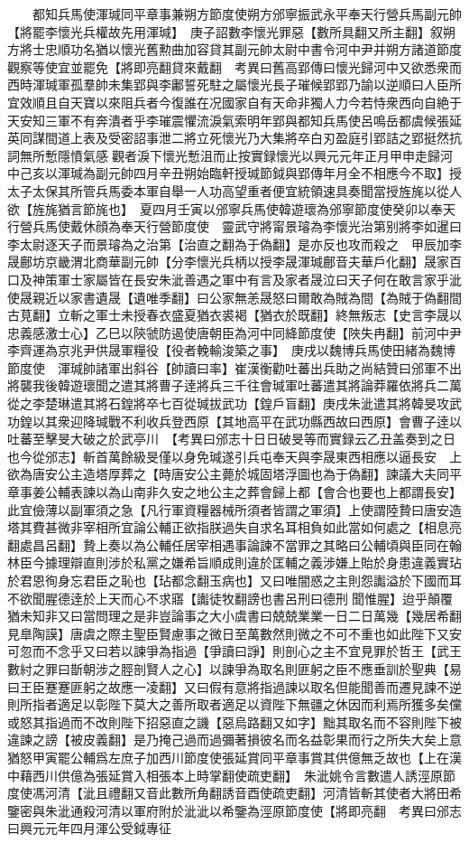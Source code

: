 　　都知兵馬使渾瑊同平章事兼朔方節度使朔方邠寧振武永平奉天行營兵馬副元帥【將罷李懷光兵權故先用渾瑊】　庚子詔數李懷光罪惡【數所具翻又所主翻】叙朔方將士忠順功名猶以懷光舊勲曲加容貸其副元帥太尉中書令河中尹并朔方諸道節度觀察等使宜並罷免【將即亮翻貸來戴翻　考異曰舊高郢傳曰懷光歸河中又欲悉衆而西時渾瑊軍孤羣帥未集郢與李鄘誓死駐之屬懷光長子璀候郢郢乃諭以逆順曰人臣所宜效順且自天寶以來阻兵者今復誰在况國家自有天命非獨人力今若恃衆西向自絶于天安知三軍不有奔潰者乎李璀震懼流淚氣索明年郢與都知兵馬使呂鳴岳都虞候張延英同謀間道上表及受密詔事泄二將立死懷光乃大集將卒白刃盈庭引郢詰之郢挺然抗詞無所慙隱憤氣感觀者淚下懷光慙沮而止按實録懷光以興元元年正月甲申走歸河中己亥以渾瑊為副元帥四月辛丑朔始臨軒授瑊節鉞與郢傳年月全不相應今不取】授太子太保其所管兵馬委本軍自舉一人功高望重者便宜統領速具奏聞當授旌旄以從人欲【旌旄猶言節旄也】　夏四月壬寅以邠寧兵馬使韓遊瓌為邠寧節度使癸卯以奉天行營兵馬使戴休顔為奉天行營節度使　靈武守將甯景璿為李懷光治第别將李如暹曰李太尉逐天子而景璿為之治第【治直之翻為于偽翻】是亦反也攻而殺之　甲辰加李晟鄜坊京畿渭北商華副元帥【分李懷光兵柄以授李晟渾瑊鄜音夫華戶化翻】晟家百口及神策軍士家屬皆在長安朱泚善遇之軍中有言及家者晟泣曰天子何在敢言家乎泚使晟親近以家書遺晟【遺唯季翻】曰公家無恙晟怒曰爾敢為賊為間【為賊于偽翻間古莧翻】立斬之軍士未授春衣盛夏猶衣裘褐【猶衣於既翻】終無叛志【史言李晟以忠義感激士心】乙巳以陝虢防遏使唐朝臣為河中同絳節度使【陜失冉翻】前河中尹李齊運為京兆尹供晟軍糧役【役者輓輸浚築之事】　庚戌以魏博兵馬使田緒為魏博節度使　渾瑊帥諸軍出斜谷【帥讀曰率】崔漢衡勸吐蕃出兵助之尚結贊曰邠軍不出將襲我後韓遊瓌聞之遣其將曹子逹將兵三千往會瑊軍吐蕃遣其將論莽羅依將兵二萬從之李楚琳遣其將石鍠將卒七百從瑊拔武功【鍠戶盲翻】庚戌朱泚遣其將韓旻攻武功鍠以其衆迎降瑊戰不利收兵登西原【其地高平在武功縣西故曰西原】會曹子逹以吐蕃至擊旻大破之於武亭川　【考異曰邠志十日日破旻等而實録云乙丑盖奏到之日也今從邠志】斬首萬餘級旻僅以身免瑊遂引兵屯奉天與李晟東西相應以逼長安　上欲為唐安公主造塔厚葬之【時唐安公主薨於城固塔浮圖也為于偽翻】諫議大夫同平章事姜公輔表諫以為山南非久安之地公主之葬會歸上都【會合也要也上都謂長安】此宜儉薄以副軍須之急【凡行軍資糧器械所須者皆謂之軍須】上使謂陸贄曰唐安造塔其費甚微非宰相所宜論公輔正欲指朕過失自求名耳相負如此當如何處之【相息亮翻處昌呂翻】贄上奏以為公輔任居宰相遇事論諫不當罪之其略曰公輔頃與臣同在翰林臣今據理辯直則涉於私黨之嫌希旨順成則違於匡輔之義涉嫌上貽於身患違義實玷於君恩徇身忘君臣之恥也【玷都念翻玉病也】又曰唯闇惑之主則怨讟溢於下國而耳不欲聞腥德逹於上天而心不求寤【讟徒牧翻謗也書呂刑曰德刑聞惟腥】迨乎顛覆猶未知非又曰當問理之是非豈論事之大小虞書曰兢兢業業一日二日萬幾【幾居希翻見臯陶謨】唐虞之際主聖臣賢慮事之微日至萬數然則微之不可不重也如此陛下又安可忽而不念乎又曰若以諫爭為指過【爭讀曰諍】則剖心之主不宜見罪於哲王【武王數紂之罪曰斮朝涉之脛剖賢人之心】以諫爭為取名則匪躬之臣不應垂訓於聖典【易曰王臣蹇蹇匪躬之故應一凌翻】又曰假有意將指過諫以取名但能聞善而遷見諫不逆則所指者適足以彰陛下莫大之善所取者適足以資陛下無疆之休因而利焉所獲多矣儻或怒其指過而不改則陛下招惡直之譏【惡烏路翻又如字】黜其取名而不容則陛下被違諫之謗【被皮義翻】是乃掩己過而過彌著損彼名而名益彰果而行之所失大矣上意猶怒甲寅罷公輔爲左庶子加西川節度使張延賞同平章事賞其供億無乏故也【上在漢中藉西川供億為張延賞入相張本上時掌翻使疏吏翻】　朱泚姚令言數遣人誘涇原節度使馮河清【泚且禮翻又音此數所角翻誘音酉使疏吏翻】河清皆斬其使者大將田希鑒密與朱泚通殺河清以軍府附於泚泚以希鑒為涇原節度使【將即亮翻　考異曰邠志曰興元元年四月渾公受鉞專征
